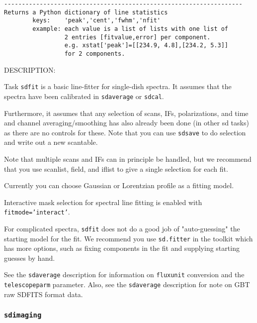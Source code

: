 \begin{verbatim}
-------------------------------------------------------------------
Returns a Python dictionary of line statistics
        keys:    'peak','cent','fwhm','nfit'
        example: each value is a list of lists with one list of
                 2 entries [fitvalue,error] per component.
                 e.g. xstat['peak']=[[234.9, 4.8],[234.2, 5.3]]
                 for 2 components.
\end{verbatim}

    DESCRIPTION:

    Task {\tt sdfit} is a basic line-fitter for single-dish spectra.
    It assumes that the spectra have been calibrated in {\tt sdaverage}
    or {\tt sdcal}.

    Furthermore, it assumes that any selection of scans, IFs,
    polarizations, and time and channel averaging/smoothing has
    also already been done (in other sd tasks) as there are no controls
    for these.  Note that you can use {\tt sdsave} to do selection and write
    out a new scantable.

    Note that multiple scans and IFs can in principle be handled, but
    we recommend that you use scanlist, field, and iflist to give a
    single selection for each fit.

    Currently you can choose Gaussian or Lorentzian profile as a fitting model.
    
    Interactive mask selection for spectral line fitting is enabled with
{\tt fitmode='interact'}. 
    
    For complicated spectra, {\tt sdfit} does not do a good job of
    "auto-guessing" the starting model for the fit.  We recommend
    you use {\tt sd.fitter} in the toolkit which has more options, such
    as fixing components in the fit and supplying starting guesses
    by hand.

    See the {\tt sdaverage} description for information on {\tt fluxunit} 
    conversion and the {\tt telescopeparm} parameter.
    Also, see the {\tt sdaverage} description for note on GBT raw SDFITS format data.

    
\subsubsection{{\tt sdimaging}}
\label{section:sd.sdtasks.tasks.sdimaging}


